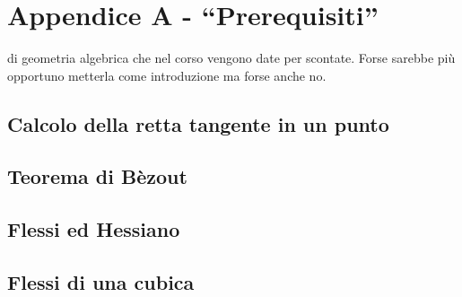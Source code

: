 \chapter{Appendice A - ``Prerequisiti''}
\justify

 di geometria algebrica che nel corso vengono date per scontate. Forse sarebbe più opportuno metterla come introduzione ma forse anche no.

\section{Calcolo della retta tangente in un punto}

\section{Teorema di Bèzout}

\section{Flessi ed Hessiano}

\section{Flessi di una cubica}

